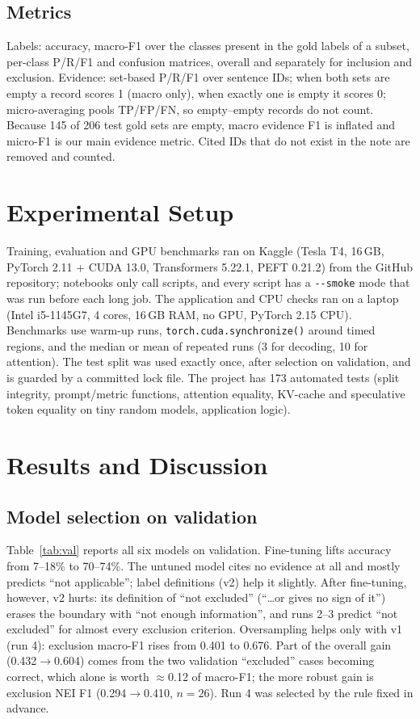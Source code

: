 \documentclass[conference]{IEEEtran}
\begin{document}
\subsection{Metrics}
Labels: accuracy, macro-F1 over the classes present in the gold labels of a subset, per-class P/R/F1 and confusion matrices, overall and separately for inclusion and exclusion. Evidence: set-based P/R/F1 over sentence IDs; when both sets are empty a record scores 1 (macro only), when exactly one is empty it scores 0; micro-averaging pools TP/FP/FN, so empty--empty records do not count. Because 145 of 206 test gold sets are empty, macro evidence F1 is inflated and micro-F1 is our main evidence metric. Cited IDs that do not exist in the note are removed and counted.

\section{Experimental Setup}
Training, evaluation and GPU benchmarks ran on Kaggle (Tesla T4, 16\,GB, PyTorch 2.11 + CUDA 13.0, Transformers 5.22.1, PEFT 0.21.2) from the GitHub repository; notebooks only call scripts, and every script has a \texttt{-{}-smoke} mode that was run before each long job. The application and CPU checks ran on a laptop (Intel i5-1145G7, 4 cores, 16\,GB RAM, no GPU, PyTorch 2.15 CPU). Benchmarks use warm-up runs, \texttt{torch.cuda.synchronize()} around timed regions, and the median or mean of repeated runs (3 for decoding, 10 for attention). The test split was used exactly once, after selection on validation, and is guarded by a committed lock file. The project has 173 automated tests (split integrity, prompt/metric functions, attention equality, KV-cache and speculative token equality on tiny random models, application logic).

\section{Results and Discussion}
\label{sec:results}
\subsection{Model selection on validation}
Table~\ref{tab:val} reports all six models on validation. Fine-tuning lifts accuracy from 7--18\% to 70--74\%. The untuned model cites no evidence at all and mostly predicts ``not applicable''; label definitions (v2) help it slightly. After fine-tuning, however, v2 hurts: its definition of ``not excluded'' (``\ldots or gives no sign of it'') erases the boundary with ``not enough information'', and runs 2--3 predict ``not excluded'' for almost every exclusion criterion. Oversampling helps only with v1 (run 4): exclusion macro-F1 rises from 0.401 to 0.676. Part of the overall gain (0.432$\to$0.604) comes from the two validation ``excluded'' cases becoming correct, which alone is worth $\approx$0.12 of macro-F1; the more robust gain is exclusion NEI F1 (0.294$\to$0.410, $n{=}26$). Run 4 was selected by the rule fixed in advance.
\end{document}
